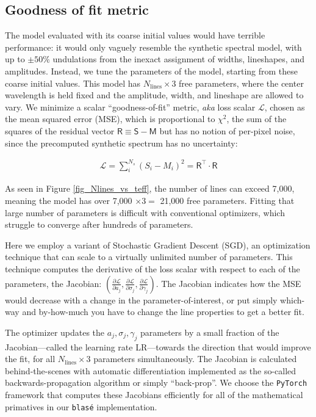 \documentclass[modern]{aastex631}
\begin{document}
\subsection{Goodness of fit metric}
The model evaluated with its coarse initial values would have terrible performance: it would only vaguely resemble the synthetic spectral model, with up to $\pm 50\%$ undulations from the inexact assignment of widths, lineshapes, and amplitudes.  Instead, we tune the parameters of the model, starting from these coarse initial values.  This model has $N_{\mathrm{lines}}\times 3$ free parameters, where the center wavelength is held fixed and the amplitude, width, and lineshape are allowed to vary.  We minimize a scalar ``goodness-of-fit'' metric, \emph{aka} loss scalar $\mathcal{L}$, chosen as the mean squared error (MSE), which is proportional to $\chi^2$, the sum of the squares of the residual vector $\mathsf{R} \equiv \mathsf{S}-\mathsf{M}$ but has no notion of per-pixel noise, since the precomputed synthetic spectrum has no uncertainty:

\begin{eqnarray}
  \mathcal{L} = \sum_i^{N_s} (S_i - M_i)^2 = \mathsf{R^\intercal}\cdot \mathsf{R}
\end{eqnarray}


As seen in Figure \ref{fig_Nlines_vs_teff}, the number of lines can exceed 7,000, meaning the model has over 7,000 $\times 3 =$ 21,000 free parameters.  Fitting that large number of parameters is difficult with conventional optimizers, which struggle to converge after hundreds of parameters.

Here we employ a variant of Stochastic Gradient Descent (SGD), an optimization technique that can scale to a virtually unlimited number of parameters.  This technique computes the derivative of the loss scalar with respect to each of the parameters, the Jacobian: $(\frac{\partial \mathcal{L}}{\partial a_j}, \frac{\partial \mathcal{L}}{\partial \sigma_j}, \frac{\partial \mathcal{L}}{\partial \gamma_j})$.  The Jacobian indicates how the MSE would decrease with a change in the parameter-of-interest, or put simply which-way and by-how-much you have to change the line properties to get a better fit.

The optimizer updates the $a_j, \sigma_j, \gamma_j$ parameters by a small fraction of the Jacobian---called the learning rate LR---towards the direction that would improve the fit, for all $N_{\mathrm{lines}} \times 3$ parameters simultaneously.  The Jacobian is calculated behind-the-scenes with automatic differentiation implemented as the so-called backwards-propagation algorithm or simply ``back-prop''.  We choose the \texttt{PyTorch} framework that computes these Jacobians efficiently for all of the mathematical primatives in our \texttt{blas\'e} implementation.
\end{document}
